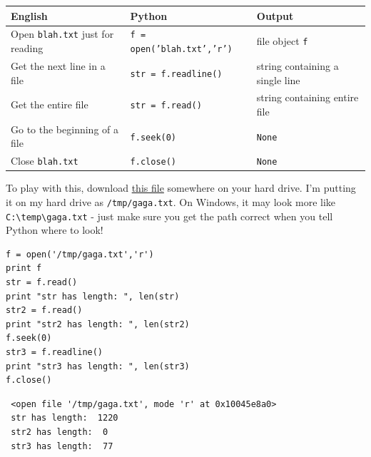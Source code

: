 \documentclass[11pt]{article}
\begin{document}
\begin{center}
\begin{tabular}{l|l|l}
 English                                  &  Python                             &  Output                           \\
\hline
 Open \texttt{blah.txt} just for reading  &  \texttt{f = open('blah.txt','r')}  &  file object \texttt{f}           \\
 Get the next line in a file              &  \texttt{str = f.readline()}        &  string containing a single line  \\
 Get the entire file                      &  \texttt{str = f.read()}            &  string containing entire file    \\
 Go to the beginning of a file            &  \texttt{f.seek(0)}                 &  \texttt{None}                    \\
 Close \texttt{blah.txt}                  &  \texttt{f.close()}                 &  \texttt{None}                    \\
\end{tabular}
\end{center}



To play with this, download \href{http://www.people.fas.harvard.edu/~astorer/scraping/gaga.txt}{this file} somewhere on your hard drive.
I'm putting it on my hard drive as \texttt{/tmp/gaga.txt}.  On Windows, it
may look more like \texttt{C:\textbackslash{}temp\textbackslash{}gaga.txt} - just make sure you get the
path correct when you tell Python where to look!


\begin{verbatim}
f = open('/tmp/gaga.txt','r')
print f
str = f.read()
print "str has length: ", len(str)
str2 = f.read()
print "str2 has length: ", len(str2)
f.seek(0)
str3 = f.readline()
print "str3 has length: ", len(str3)
f.close()
\end{verbatim}

\begin{verbatim}
 <open file '/tmp/gaga.txt', mode 'r' at 0x10045e8a0>
 str has length:  1220
 str2 has length:  0
 str3 has length:  77
\end{verbatim}
\end{document}
